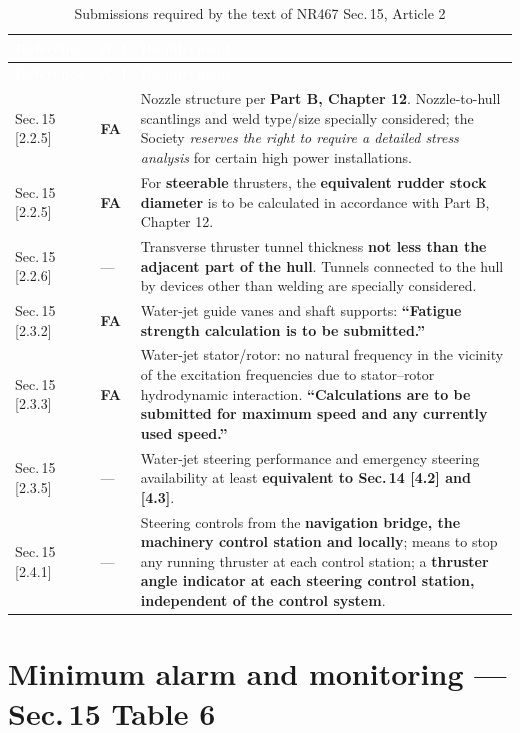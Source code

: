 \documentclass[11pt,a4paper]{report}
\newcommand{\fa}{\textbf{\textcolor{warningred}{FA}}}
\begin{document}
\begin{longtable}{|p{4.6cm}|p{1.1cm}|p{7.8cm}|}
\caption{Submissions required by the text of NR467 Sec.\,15, Article 2} \label{tab:s15calc} \\
\hline
\rowcolor{bvblue}
\textcolor{white}{\textbf{Reference}} & \textcolor{white}{\textbf{A/I}} & \textcolor{white}{\textbf{Requirement}} \\
\hline
\endfirsthead
\hline
\rowcolor{bvblue}
\textcolor{white}{\textbf{Reference}} & \textcolor{white}{\textbf{A/I}} & \textcolor{white}{\textbf{Requirement}} \\
\hline
\endhead
\hline
\endlastfoot
Sec.\,15 [2.2.5] & \fa{} & Nozzle structure per \textbf{Part B, Chapter 12}. Nozzle-to-hull scantlings and weld type/size specially considered; the Society \emph{reserves the right to require a detailed stress analysis} for certain high power installations. \\
\hline
Sec.\,15 [2.2.5] & \fa{} & For \textbf{steerable} thrusters, the \textbf{equivalent rudder stock diameter} is to be calculated in accordance with Part B, Chapter 12. \\
\hline
Sec.\,15 [2.2.6] & --- & Transverse thruster tunnel thickness \textbf{not less than the adjacent part of the hull}. Tunnels connected to the hull by devices other than welding are specially considered. \\
\hline
Sec.\,15 [2.3.2] & \fa{} & Water-jet guide vanes and shaft supports: \textbf{``Fatigue strength calculation is to be submitted.''} \\
\hline
Sec.\,15 [2.3.3] & \fa{} & Water-jet stator/rotor: no natural frequency in the vicinity of the excitation frequencies due to stator--rotor hydrodynamic interaction. \textbf{``Calculations are to be submitted for maximum speed and any currently used speed.''} \\
\hline
Sec.\,15 [2.3.5] & --- & Water-jet steering performance and emergency steering availability at least \textbf{equivalent to Sec.\,14 [4.2] and [4.3]}. \\
\hline
Sec.\,15 [2.4.1] & --- & Steering controls from the \textbf{navigation bridge, the machinery control station and locally}; means to stop any running thruster at each control station; a \textbf{thruster angle indicator at each steering control station, independent of the control system}. \\
\hline
\end{longtable}

\section{Minimum alarm and monitoring --- Sec.\,15 Table 6}
\end{document}
